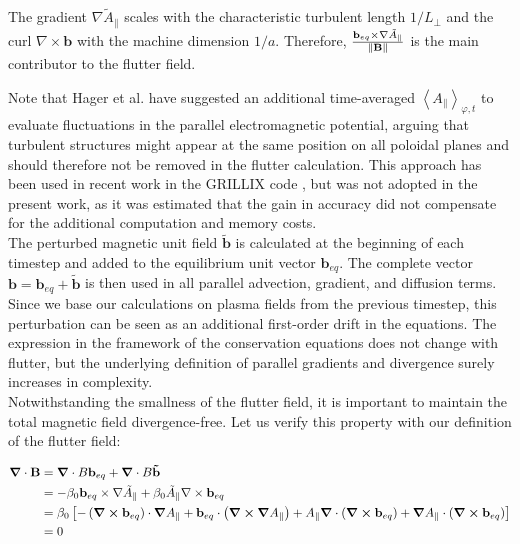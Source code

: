 The gradient $\nabla \tilde{A}_\parallel$ scales with the characteristic turbulent length $1/L_\perp$ and the curl $\nabla \times \mathbf{b}$ with the machine dimension $1/a$. Therefore, $\frac{\mathbf{b}_{eq} \times \nabla \tilde{A}_\parallel}{\norm{\mathbf{B}}}$ is the main contributor to the flutter field.

Note that Hager et al. \cite{hager2022} have suggested an additional time-averaged $\left<A_\parallel\right>_{\varphi,t}$ to evaluate fluctuations in the parallel electromagnetic potential, arguing that turbulent structures might appear at the same position on all poloidal planes and should therefore not be removed in the flutter calculation. This approach has been used in recent work in the GRILLIX code \cite{zhang2024}, but was not adopted in the present work, as it was estimated that the gain in accuracy did not compensate for the additional computation and memory costs. \\

The perturbed magnetic unit field $\tilde{\mathbf{b}}$ is calculated at the beginning of each timestep and added to the equilibrium unit vector $\mathbf{b}_{eq}$. The complete vector $\mathbf{b} = \mathbf{b}_{eq} + \tilde{\mathbf{b}}$ is then used in all parallel advection, gradient, and diffusion terms. Since we base our calculations on plasma fields from the previous timestep, this perturbation can be seen as an additional first-order drift in the equations. The expression in the framework of the conservation equations does not change with flutter, but the underlying definition of parallel gradients and divergence surely increases in complexity. \\

Notwithstanding the smallness of the flutter field, it is important to maintain the total magnetic field divergence-free. Let us verify this property with our definition of the flutter field:

\begin{align}
	\grad\cdot\mathbf{B} &= \grad\cdot B\mathbf{b}_{eq} + \grad\cdot B\mathbf{\tilde{b}} \nonumber \\
	&= -\beta_0\mathbf{b}_{eq} \times \nabla \tilde{A}_\parallel + \beta_0\tilde{A}_\parallel \nabla \times \mathbf{b}_{eq} \nonumber \\
	&= \beta_0\left[-\left(\grad\cross\mathbf{b}_{eq}\right)\cdot\grad A_\parallel + \mathbf{b}_{eq}\cdot\left(\grad\cross\grad A_\parallel\right) + A_\parallel\grad\cdot\left(\grad\cross\mathbf{b}_{eq}\right) + \grad A_\parallel\cdot\left(\grad\cross\mathbf{b}_{eq}\right)\right] \nonumber \\
	&= 0
\end{align}

